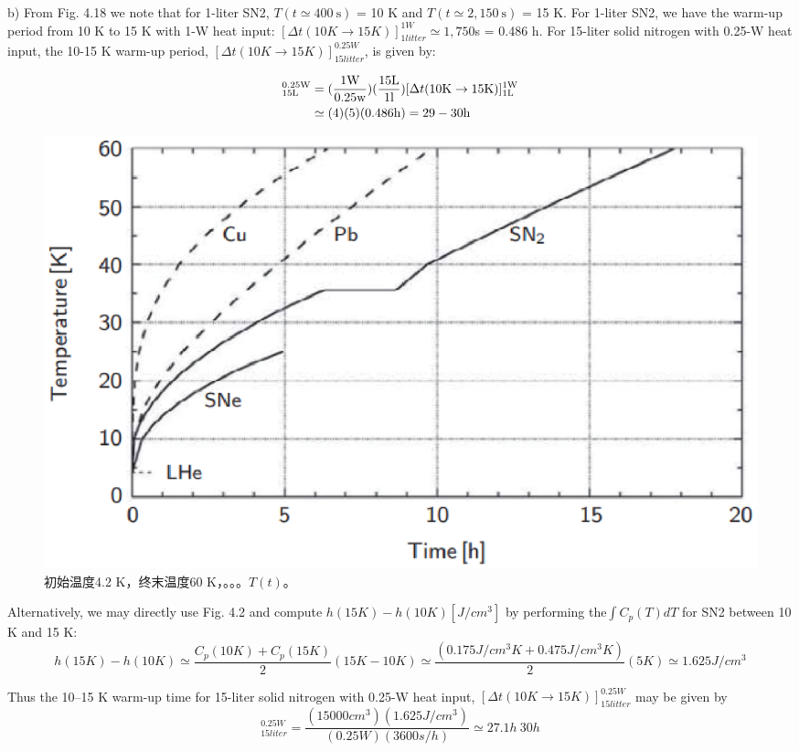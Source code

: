b) From Fig. 4.18 we note that for 1-liter SN2, $T(t\simeq 400\ \mathrm{s})$ = 10 K and
$T(t\simeq 2,150\ \mathrm{s})$ = 15 K. For 1-liter SN2, we have the warm-up period from 10 K to 15 K
with 1-W heat input: $[\Delta t(10 K\rightarrow 15 K)]_{1 litter}^{1 W}\simeq 1,750$s = 0.486 h. For 15-liter
solid nitrogen with 0.25-W heat input, the 10-15 K warm-up period, $[\Delta t(10 K\rightarrow 15 K)]_{15 litter}^{0.25 W}$, is given by:

\begin{align*}%
[\Delta t(10\mathrm{K}\rightarrow 15\mathrm{K})]_{15\mathrm{L}}^{0.25\mathrm{W}}&=(\frac{1\mathrm{W}}{0.25\mathrm{w}})(\frac{15\mathrm{L}}{1\mathrm{l}})[\Delta t(10\mathrm{K}\rightarrow 15\mathrm{K})]_{1\mathrm{L}}^{1\mathrm{W}}\\\notag
&\simeq (4)(5)(0.486\mathrm{h})=29-30\mathrm{h}
\end{align*}


\begin{figure}[htbp]
	\centering
	\includegraphics[scale=0.6]{chpt4/figs/fig4.18.eps}
	\caption{初始温度4.2 K，终末温度60 K，。。。$T(t)$。}
\end{figure}

Alternatively, we may directly use Fig. 4.2 and compute $h(15 K)−h(10 K) [J/cm^3]$
by performing the$\int C_p(T)dT$ for SN2 between 10 K and 15 K:
\begin{equation*}%
h(15K)-h(10K)\simeq\frac{C_p(10K)+C_p(15K)}{2}(15K-10K)
\simeq\frac{(0.175J/cm^3K+0.475J/cm^3K)}{2}(5K)
\simeq1.625J/cm^3
\end{equation*}

Thus the 10–15 K warm-up time for 15-liter solid nitrogen with 0.25-W heat input,
$[\Delta t(10 K\rightarrow 15 K)]_{15 litter}^{0.25 W}$ may be given by
\begin{equation*}%
[\Delta(10K \rightarrow15K)]_{15liter}^{0.25W}=\frac{(15000cm^3)(1.625J/cm^3)}{(0.25W)(3600s/h)}\simeq27.1h~30h
\end{equation*}

